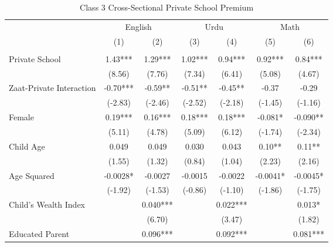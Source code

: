\begin{table}[htbp]\centering
\def\sym#1{\ifmmode^{#1}\else\(^{#1}\)\fi}
\caption{Class 3 Cross-Sectional Private School Premium\label{crosssection}}
\begin{tabular}{l*{6}{c}}
\toprule
                &\multicolumn{2}{c}{English}&\multicolumn{2}{c}{Urdu} &\multicolumn{2}{c}{Math} \\\cmidrule(lr){2-3}\cmidrule(lr){4-5}\cmidrule(lr){6-7}
                &\multicolumn{1}{c}{(1)}&\multicolumn{1}{c}{(2)}&\multicolumn{1}{c}{(3)}&\multicolumn{1}{c}{(4)}&\multicolumn{1}{c}{(5)}&\multicolumn{1}{c}{(6)}\\
                &\multicolumn{1}{c}{}&\multicolumn{1}{c}{}&\multicolumn{1}{c}{}&\multicolumn{1}{c}{}&\multicolumn{1}{c}{}&\multicolumn{1}{c}{}\\
\midrule
Private School  &     1.43***&     1.29***&     1.02***&     0.94***&     0.92***&     0.84***\\
                &   (8.56)   &   (7.76)   &   (7.34)   &   (6.41)   &   (5.08)   &   (4.67)   \\
Zaat-Private Interaction&    -0.70***&    -0.59** &    -0.51** &    -0.45** &    -0.37   &    -0.29   \\
                &  (-2.83)   &  (-2.46)   &  (-2.52)   &  (-2.18)   &  (-1.45)   &  (-1.16)   \\
Female          &     0.19***&     0.16***&     0.18***&     0.18***&   -0.081*  &   -0.090** \\
                &   (5.11)   &   (4.78)   &   (5.09)   &   (6.12)   &  (-1.74)   &  (-2.34)   \\
Child Age       &    0.049   &    0.049   &    0.030   &    0.043   &     0.10** &     0.11** \\
                &   (1.55)   &   (1.32)   &   (0.84)   &   (1.04)   &   (2.23)   &   (2.16)   \\
Age Squared     &  -0.0028*  &  -0.0027   &  -0.0015   &  -0.0022   &  -0.0041*  &  -0.0045*  \\
                &  (-1.92)   &  (-1.53)   &  (-0.86)   &  (-1.10)   &  (-1.86)   &  (-1.75)   \\
Child's Wealth Index&            &    0.040***&            &    0.022***&            &    0.013*  \\
                &            &   (6.70)   &            &   (3.47)   &            &   (1.82)   \\
Educated Parent &            &    0.096***&            &    0.092***&            &    0.081***\\

\end{tabular}
\end{table}
